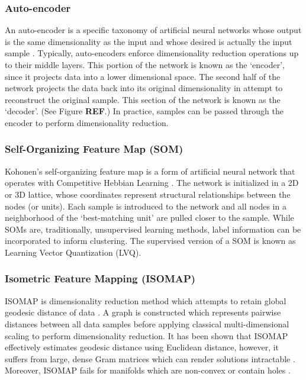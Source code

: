 \documentclass[conference]{IEEEtran}
\begin{document}
	\subsubsection*{Auto-encoder} An auto-encoder is a specific taxonomy of artificial neural networks whose output is the same dimensionality as the input and whose desired is actually the input sample \cite{Haykin2009NeuralNetworks,Goodfellow2016DeepLearning}. Typically, auto-encoders enforce dimensionality reduction operations up to their middle layers.  This portion of the network is known as the `encoder', since it projects data into a lower dimensional space.  The second half of the network projects the data back into its original dimensionality in attempt to reconstruct the original sample.  This section of the network is known as the `decoder'. (See Figure \textbf{REF}.)  In practice, samples can be passed through the encoder to perform dimensionality reduction.
	\subsubsection*{Self-Organizing Feature Map (SOM)} Kohonen's self-organizing feature map is a form of artificial neural network that operates with Competitive Hebbian Learning \cite{Haykin2009NeuralNetworks,Kohonen1990SOM,Fritzke1995GrowingNeuralGas}.  The network is initialized in a 2D or 3D lattice, whose coordinates represent structural relationships between the nodes (or units).  Each sample is introduced to the network and all nodes in a neighborhood of the `best-matching unit' are pulled closer to the sample. While SOMs are, traditionally, unsupervised learning methods, label information can be incorporated to inform clustering.  The supervised version of a SOM  is known as Learning Vector Quantization (LVQ).
	\subsubsection*{Isometric Feature Mapping (ISOMAP)} ISOMAP is dimensionality reduction method which attempts to retain global geodesic distance of data \cite{Tenenbaum2000Isomap}.  A graph is constructed which represents pairwise distances between all data samples before  applying classical multi-dimensional scaling to perform dimensionality reduction.  It has been shown that ISOMAP effectively estimates geodesic distance using Euclidean distance, however, it suffers from large, dense Gram matrices which can render solutions intractable \cite{Thorstensen2009ManifoldThesis}.  Moreover, ISOMAP fails for manifolds which are non-convex or contain holes \cite{VanDerMaaten2009DRReview}.
\end{document}
